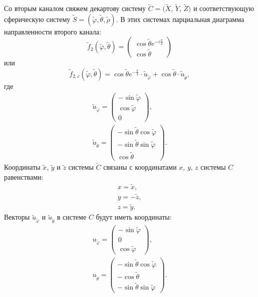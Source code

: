 Со вторым каналом свяжем декартову систему $\widetilde{C} = (\widetilde{X}$, $\widetilde{Y}$, $\widetilde{Z})$ и соответствующую сферическую систему
$\widetilde{S} = (\widetilde{\varphi}, \widetilde{\theta}, \widetilde{\rho})$. В этих системах парциальная диаграмма направленности второго канала:
\[
    \widetilde{f}_2(\widetilde{\varphi}, \widetilde{\theta}) =
    \begin{pmatrix}
        \cos \widetilde{\theta} e^{-i\frac{\pi}{4}} \\
        \cos \widetilde{\theta}
    \end{pmatrix}
\]
или
\[
    \widetilde{f}_{2,c}(\widetilde{\varphi}, \widetilde{\theta})
    = \cos \widetilde{\theta} e^{-\frac{\pi}{4}} \cdot \widetilde{u}_{\widetilde{\varphi}} + \cos \widetilde{\theta} \cdot \widetilde{u}_{\widetilde{\theta}} ,
\]
где
\begin{gather*}
    \widetilde{u}_{\widetilde{\varphi}}
    = \begin{pmatrix}
        - \sin \widetilde{\varphi} \\
        \cos \widetilde{\varphi}   \\
        0
    \end{pmatrix} , \\
    \widetilde{u}_{\widetilde{\theta}}
    = \begin{pmatrix}
        - \sin \widetilde{\theta} \cos \widetilde{\varphi} \\
        - \sin \widetilde{\theta} \sin \widetilde{\varphi} \\
        \cos \widetilde{\theta}
    \end{pmatrix}.
\end{gather*}
Координаты $\widetilde{x}$, $\widetilde{y}$ и $\widetilde{z}$ системы $\widetilde{C}$ связаны с координатами $x$, $y$, $z$ системы $C$ равенствами:
\begin{gather*}
    x = \widetilde{x} , \\
    y = - \widetilde{z} , \\
    z = \widetilde{y} .
\end{gather*}
Векторы $\widetilde{u}_{\widetilde{\varphi}}$ и $\widetilde{u}_{\widetilde{\theta}}$ в системе $C$ будут иметь координаты:
\begin{gather*}
    u_{\widetilde{\varphi}}
    = \begin{pmatrix}
        - \sin \widetilde{\varphi} \\
        0                          \\
        \cos \widetilde{\varphi}
    \end{pmatrix} , \\
    u_{\widetilde{\theta}}
    = \begin{pmatrix}
        - \sin \widetilde{\theta} \cos \widetilde{\varphi} \\
        - \cos \widetilde{\theta}                          \\
        - \sin \widetilde{\theta} \sin \widetilde{\varphi}
    \end{pmatrix}.
\end{gather*}
